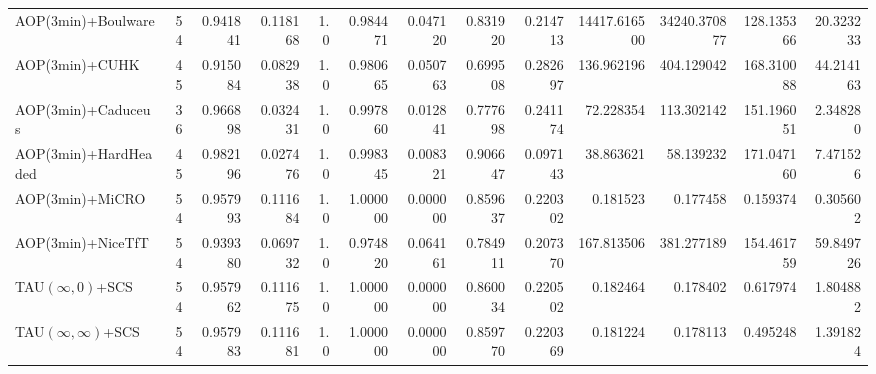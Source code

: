 \begin{tabular}{lrr|r|rr|rr|rr|rrr}
       AOP(3min)+Boulware &      54 & 0.941841 & 0.118168 &  1.0 &      0.984471 & 0.047120 &      0.831920 & 0.214713 & 14417.616500 & 34240.370877 &  128.135366 &    20.323233 \\
           AOP(3min)+CUHK &      45 & 0.915084 & 0.082938 &  1.0 &      0.980665 & 0.050763 &      0.699508 & 0.282697 &   136.962196 &   404.129042 &  168.310088 &    44.214163 \\
       AOP(3min)+Caduceus &      36 & 0.966898 & 0.032431 &  1.0 &      0.997860 & 0.012841 &      0.777698 & 0.241174 &    72.228354 &   113.302142 &  151.196051 &     2.348280 \\
     AOP(3min)+HardHeaded &      45 & 0.982196 & 0.027476 &  1.0 &      0.998345 & 0.008321 &      0.906647 & 0.097143 &    38.863621 &    58.139232 &  171.047160 &     7.471526 \\
          AOP(3min)+MiCRO &      54 & 0.957993 & 0.111684 &  1.0 &      1.000000 & 0.000000 &      0.859637 & 0.220302 &     0.181523 &     0.177458 &    0.159374 &     0.305602 \\
        AOP(3min)+NiceTfT &      54 & 0.939380 & 0.069732 &  1.0 &      0.974820 & 0.064161 &      0.784911 & 0.207370 &   167.813506 &   381.277189 &  154.461759 &    59.849726 \\
     TAU$(\infty, 0)$+SCS &      54 & 0.957962 & 0.111675 &  1.0 &      1.000000 & 0.000000 &      0.860034 & 0.220502 &     0.182464 &     0.178402 &    0.617974 &     1.804882 \\
TAU$(\infty, \infty)$+SCS &      54 & 0.957983 & 0.111681 &  1.0 &      1.000000 & 0.000000 &      0.859770 & 0.220369 &     0.181224 &     0.178113 &    0.495248 &     1.391824 \\
\bottomrule
\end{tabular}
